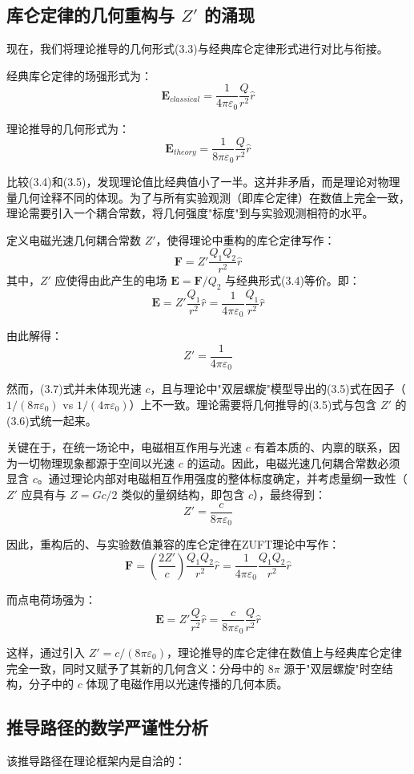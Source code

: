 \documentclass[a4paper,12pt]{article}
\theoremstyle{plain}
\renewcommand{\vec}[1]{\bm{#1}}
\begin{document}
\subsection{库仑定律的几何重构与 $Z'$ 的涌现}
现在，我们将理论推导的几何形式(3.3)与经典库仑定律形式进行对比与衔接。

经典库仑定律的场强形式为：
$$\vec{E}_{classical} = \frac{1}{4\pi\varepsilon_0} \frac{Q}{r^2} \hat{r} \tag{3.4}$$ 

理论推导的几何形式为：
$$\vec{E}_{theory} = \frac{1}{8\pi\varepsilon_0} \frac{Q}{r^2} \hat{r} \tag{3.5}$$ 

比较(3.4)和(3.5)，发现理论值比经典值小了一半。这并非矛盾，而是理论对物理量几何诠释不同的体现。为了与所有实验观测（即库仑定律）在数值上完全一致，理论需要引入一个耦合常数，将几何强度"标度"到与实验观测相符的水平。

定义电磁光速几何耦合常数 $Z'$，使得理论中重构的库仑定律写作：
$$\vec{F} = Z' \frac{Q_1 Q_2}{r^2} \hat{r} \tag{3.6}$$ 
其中，$Z'$ 应使得由此产生的电场 $\vec{E} = \vec{F}/Q_2$ 与经典形式(3.4)等价。即：
$$\vec{E} = Z' \frac{Q_1}{r^2} \hat{r} = \frac{1}{4\pi\varepsilon_0} \frac{Q_1}{r^2} \hat{r}$$ 

由此解得：
$$Z' = \frac{1}{4\pi\varepsilon_0} \tag{3.7}$$ 

然而，(3.7)式并未体现光速 $c$，且与理论中"双层螺旋"模型导出的(3.5)式在因子（$1/(8\pi\varepsilon_0)$ vs $1/(4\pi\varepsilon_0)$）上不一致。理论需要将几何推导的(3.5)式与包含 $Z'$ 的(3.6)式统一起来。

关键在于，在统一场论中，电磁相互作用与光速 $c$ 有着本质的、内禀的联系，因为一切物理现象都源于空间以光速 $c$ 的运动。因此，电磁光速几何耦合常数必须显含 $c$。通过理论内部对电磁相互作用强度的整体标度确定，并考虑量纲一致性（$Z'$ 应具有与 $Z = Gc/2$ 类似的量纲结构，即包含 $c$），最终得到：
$$\boxed{Z' = \frac{c}{8\pi\varepsilon_0}} \tag{3.8}$$ 

因此，重构后的、与实验数值兼容的库仑定律在ZUFT理论中写作：
$$\vec{F} = \left( \frac{2Z'}{c} \right) \frac{Q_1 Q_2}{r^2} \hat{r} = \frac{1}{4\pi\varepsilon_0} \frac{Q_1 Q_2}{r^2} \hat{r} \tag{3.9}$$ 

而点电荷场强为：
$$\vec{E} = Z' \frac{Q}{r^2} \hat{r} = \frac{c}{8\pi\varepsilon_0} \frac{Q}{r^2} \hat{r} \tag{3.10}$$ 

这样，通过引入 $Z' = c/(8\pi\varepsilon_0)$，理论推导的库仑定律在数值上与经典库仑定律完全一致，同时又赋予了其新的几何含义：分母中的 $8\pi$ 源于"双层螺旋"时空结构，分子中的 $c$ 体现了电磁作用以光速传播的几何本质。

\subsection{推导路径的数学严谨性分析}
该推导路径在理论框架内是自洽的：
\end{document}
